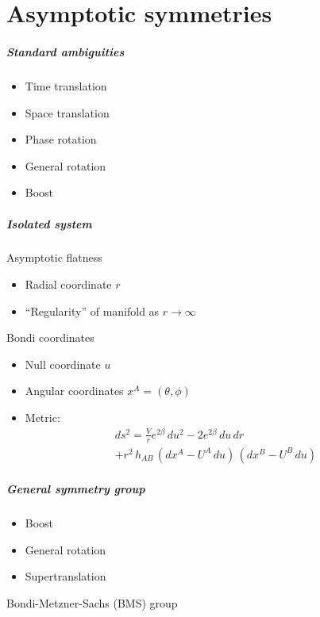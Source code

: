 \documentclass[12pt,xcolor={dvipsnames}]{beamer}
\begin{document}
\part{Asymptotic symmetries}
\partpage

\begin{frame}
  \frametitle{Standard ambiguities}
  \begin{itemize}
  \item Time translation
  \item<3-> Space translation
  \item Phase rotation
  \item<2-> General rotation
  \item<4-> Boost
  \end{itemize}

  \vspace{0.25in}

  \begin{center}

  \end{center}
\end{frame}

\begin{frame}
  \frametitle{Isolated system}
  Asymptotic flatness
  \begin{itemize}
  \item Radial coordinate $r$
  \item ``Regularity'' of manifold as $r \to \infty$
  \end{itemize}

  Bondi coordinates
  \begin{itemize}
  \item Null coordinate $u$
  \item Angular coordinates $x^{A} = (\theta, \phi)$
  \item Metric:
    \begin{multline*}
      ds^{2} = \frac{V}{r}e^{2\beta}\, du^{2} - 2e^{2\beta}\, du\, dr
      \\ + r^{2}\, h_{AB}\, (dx^{A} - U^{A}\, du)\, (dx^{B} - U^{B}\,
      du)
    \end{multline*}
  \end{itemize}
\end{frame}

\begin{frame}
  \frametitle{General symmetry group}
  \begin{itemize}
  \item Boost
  \item General rotation
  \item \alert{Supertranslation}
  \end{itemize}

  \vspace{0.25in}

  \begin{center}
    Bondi-Metzner-Sachs (BMS) group
  \end{center}
\end{frame}
\end{document}
